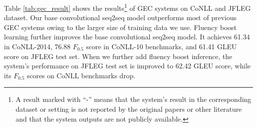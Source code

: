 \documentclass{article} %
\begin{document}
Table \ref{tab:gec_result} shows the results\footnote{A result marked with ``-'' means that the system's result in the corresponding dataset or setting is not reported by the original papers or other literature and that the system outputs are not publicly available.} of GEC systems on CoNLL and JFLEG dataset. Our base convolutional seq2seq model outperforms most of previous GEC systems owing to the larger size of training data we use. Fluency boost learning further improves the base convolutional seq2seq model. It achieves 61.34 in CoNLL-2014, 76.88 $F_{0.5}$ score in CoNLL-10 benchmarks, and 61.41 GLEU score on JFLEG test set. When we further add fluency boost inference, the system's performance on JFLEG test set is improved to 62.42 GLEU score, while its $F_{0.5}$ scores on CoNLL benchmarks drop.

\end{document}
